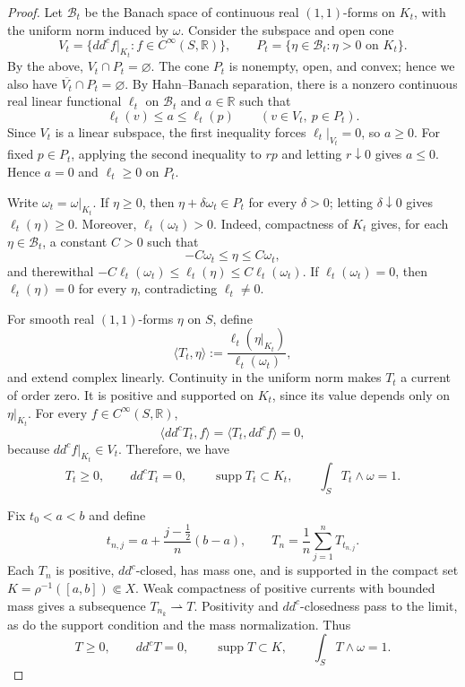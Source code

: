 \documentclass[11pt]{amsart}
\theoremstyle{definition}
\theoremstyle{remark}
\numberwithin{equation}{section}
\newcommand{\R}{\mathbb R}
\newcommand{\ddc}{dd^c}
\newcommand{\supp}{\operatorname{supp}}
\begin{document}
\begin{proof}
Let $\mathcal B_t$ be the Banach space of continuous real
$(1,1)$-forms on $K_t$, with the uniform norm induced by $\omega$.
Consider the subspace and open cone
\[
 V_t=\{\ddc f|_{K_t}:f\in C^\infty(S,\R)\},\qquad
 P_t=\{\eta\in\mathcal B_t:\eta>0\text{ on }K_t\}.
\]
By the above, $V_t\cap P_t=\varnothing$. The cone $P_t$ is nonempty,
open, and convex; hence we also have
$\overline{V_t}\cap P_t=\varnothing$.
By Hahn--Banach separation, there is a nonzero continuous real
linear functional $\ell_t$ on $\mathcal B_t$ and $a\in\R$
such that
\[
 \ell_t(v)\le a\le\ell_t(p)
 \qquad(v\in V_t,\ p\in P_t).
\]
Since $V_t$ is a linear subspace, the first inequality
forces $\ell_t|_{V_t}=0$, so $a\ge0$.
For fixed $p\in P_t$, applying the second inequality
to $rp$ and letting $r\downarrow0$ gives $a\le0$.
Hence $a=0$ and $\ell_t\ge0$ on $P_t$.

Write $\omega_t=\omega|_{K_t}$. If $\eta\ge0$, then
$\eta+\delta\omega_t\in P_t$ for every $\delta>0$;
letting $\delta\downarrow0$ gives $\ell_t(\eta)\ge0$.
Moreover, $\ell_t(\omega_t)>0$. Indeed, compactness of
$K_t$ gives, for each $\eta\in\mathcal B_t$, a constant
$C>0$ such that
\[
 -C\omega_t\le\eta\le C\omega_t,
\]
and therewithal $-C\ell_t(\omega_t)\le\ell_t(\eta)\le C\ell_t(\omega_t)$.
If $\ell_t(\omega_t)=0$, then $\ell_t(\eta)=0$ for every $\eta$, contradicting
$\ell_t\ne0$.

For smooth real $(1,1)$-forms $\eta$ on $S$, define
\[
 \langle T_t,\eta\rangle
 :=
 \frac{\ell_t(\eta|_{K_t})}{\ell_t(\omega_t)},
\]
and extend complex linearly. Continuity in the uniform
norm makes $T_t$ a current of order zero. It is positive
and supported on $K_t$, since its value depends only on
$\eta|_{K_t}$. For every $f\in C^\infty(S,\R)$,
\[
 \langle\ddc T_t,f\rangle
 =\langle T_t,\ddc f\rangle=0,
\]
because $\ddc f|_{K_t}\in V_t$. Therefore, we have
\begin{equation}\label{eq:level-current}
 T_t\ge0,\qquad \ddc T_t=0,\qquad
 \supp T_t\subset K_t,\qquad
 \int_S T_t\wedge\omega=1.
\end{equation}

Fix $t_0<a<b$ and define
\[
 t_{n,j}=a+\frac{j-\frac12}{n}(b-a),
 \qquad
 T_n=\frac1n\sum_{j=1}^nT_{t_{n,j}}.
\]
Each $T_n$ is positive, $\ddc$-closed, has mass one, and
is supported in the compact set
$K=\rho^{-1}([a,b])\Subset X$.
Weak compactness of positive currents with bounded mass
gives a subsequence $T_{n_k}\rightharpoonup T$.
Positivity and $\ddc$-closedness pass to the limit, as do
the support condition and the mass normalization. Thus
\[
 T\ge0,\qquad \ddc T=0,\qquad
 \supp T\subset K,\qquad
 \int_S T\wedge\omega=1.
\]


\end{proof}
\end{document}
